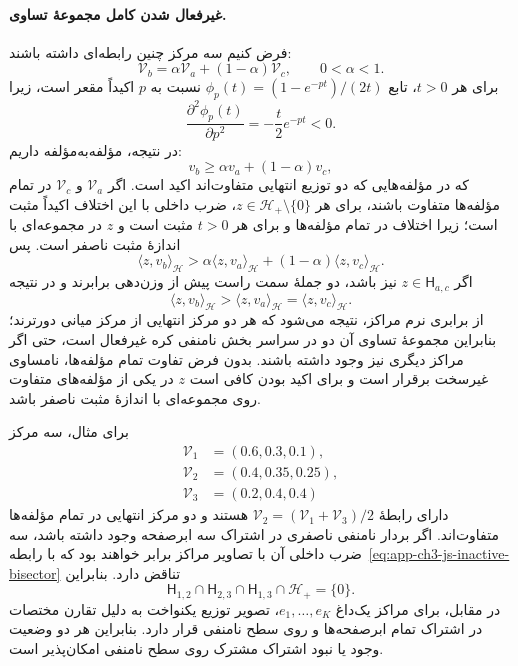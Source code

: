 \paragraph{غیرفعال شدن کامل مجموعهٔ تساوی.}
فرض کنیم سه مرکز چنین رابطه‌ای داشته باشند:
\[
\mathcal V_b=\alpha\mathcal V_a+
(1-\alpha)\mathcal V_c,\qquad 0<\alpha<1.
\]
برای هر $t>0$، تابع
$\phi_p(t)=(1-e^{-pt})/(2t)$ نسبت به $p$
اکیداً مقعر است، زیرا
\[
\frac{\partial^2\phi_p(t)}{\partial p^2}
=-\frac{t}{2}e^{-pt}<0.
\]
در نتیجه، مؤلفه‌به‌مؤلفه داریم:
\[
v_b\ge \alpha v_a+(1-\alpha)v_c,
\]
که در مؤلفه‌هایی که دو توزیع انتهایی متفاوت‌اند
اکید است. اگر $\mathcal V_a$ و $\mathcal V_c$
در تمام مؤلفه‌ها متفاوت باشند، برای هر
$z\in\mathcal H_+\setminus\{0\}$، ضرب داخلی
با این اختلاف اکیداً مثبت است؛ زیرا اختلاف در
تمام مؤلفه‌ها و برای هر $t>0$ مثبت است و $z$
در مجموعه‌ای با اندازهٔ مثبت ناصفر است. پس
\[
\langle z,v_b\rangle_{\mathcal H}>
\alpha\langle z,v_a\rangle_{\mathcal H}
+(1-\alpha)\langle z,v_c\rangle_{\mathcal H}.
\]
اگر $z\in\mathsf H_{a,c}$ نیز باشد،
دو جملهٔ سمت راست پیش از وزن‌دهی برابرند و
در نتیجه
\begin{equation}\label{eq:app-ch3-js-inactive-bisector}
\langle z,v_b\rangle_{\mathcal H}>
\langle z,v_a\rangle_{\mathcal H}
=\langle z,v_c\rangle_{\mathcal H}.
\end{equation}
از برابری نرم مراکز، نتیجه می‌شود که هر دو
مرکز انتهایی از مرکز میانی دورترند؛ بنابراین
مجموعهٔ تساوی آن دو در سراسر بخش نامنفی کره
غیرفعال است، حتی اگر مراکز دیگری نیز وجود داشته
باشند. بدون فرض تفاوت تمام مؤلفه‌ها، نامساوی
غیرسخت برقرار است و برای اکید بودن کافی است
$z$ در یکی از مؤلفه‌های متفاوت روی مجموعه‌ای
با اندازهٔ مثبت ناصفر باشد.

برای مثال، سه مرکز
\[
\begin{aligned}
\mathcal V_1&=(0.6,0.3,0.1),\\
\mathcal V_2&=(0.4,0.35,0.25),\\
\mathcal V_3&=(0.2,0.4,0.4)
\end{aligned}
\]
دارای رابطهٔ $\mathcal V_2=(\mathcal V_1+\mathcal V_3)/2$
هستند و دو مرکز انتهایی در تمام مؤلفه‌ها متفاوت‌اند.
اگر بردار نامنفی ناصفری در اشتراک سه ابرصفحه
وجود داشته باشد، سه ضرب داخلی آن با تصاویر
مراکز برابر خواهند بود که با
رابطه~\eqref{eq:app-ch3-js-inactive-bisector}
تناقض دارد. بنابراین
\[
\mathsf H_{1,2}\cap\mathsf H_{2,3}\cap
\mathsf H_{1,3}\cap\mathcal H_+=\{0\}.
\]
در مقابل، برای مراکز یک‌داغ $e_1,\ldots,e_K$،
تصویر توزیع یکنواخت به دلیل تقارن مختصات
در اشتراک تمام ابرصفحه‌ها و روی سطح نامنفی
قرار دارد. بنابراین هر دو وضعیت وجود یا نبود
اشتراک مشترک روی سطح نامنفی امکان‌پذیر است.

